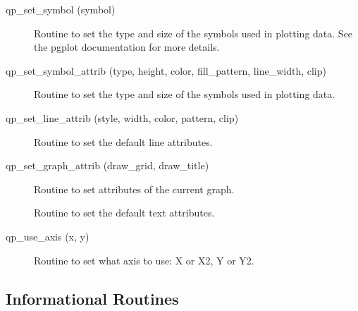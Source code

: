 \begin{description}
\label{r:qp.set.symbol}
\item[qp_set_symbol (symbol)] \Newline 
     Routine to set the type and size of the symbols used in plotting data.
     See the pgplot documentation for more details.

\label{r:qp.set.symbol.attrib}
\item[qp_set_symbol_attrib (type, height, color, fill_pattern, line_width, clip)] \Newline 
     Routine to set the type and size of the symbols used in plotting data.

\label{r:qp.set.line.attrib}
\item[qp_set_line_attrib (style, width, color, pattern, clip)] \Newline 
     Routine to set the default line attributes.

\label{r:qp.set.graph.attrib}
\item[qp_set_graph_attrib (draw_grid, draw_title)] \Newline 
     Routine to set attributes of the current graph.

\label{r:qp.set.text.attrib}
\item[\protect\parbox{6in}{qp_set_text_attrib (who, height, color, \\
  \hspace*{1in} background, uniform_spacing, spacing_factor)} ] \Newline 
     Routine to set the default text attributes.

\label{r:qp.use.axis}
\item[qp_use_axis (x, y)] \Newline 
Routine to set what axis to use: X or X2, Y or Y2.

\end{description}

\subsection{Informational Routines}

